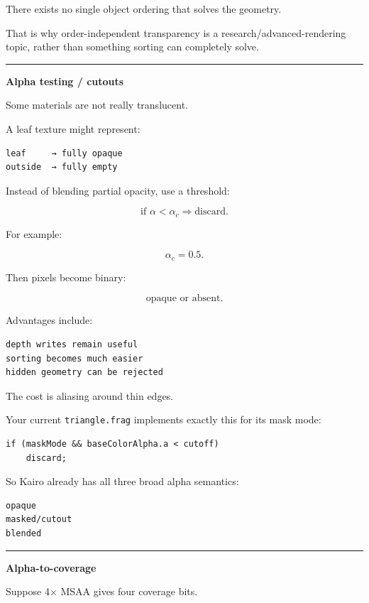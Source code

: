 There exists no single object ordering that solves the geometry.

That is why order-independent transparency is a research/advanced-rendering topic, rather than something sorting can completely solve.

\begin{center}\rule{0.5\linewidth}{0.5pt}\end{center}

\textbf{Alpha testing / cutouts}

Some materials are not really translucent.

A leaf texture might represent:

\begin{verbatim}
leaf     → fully opaque
outside  → fully empty
\end{verbatim}

Instead of blending partial opacity, use a threshold:

\[
\text{if }\alpha < \alpha_c
\Rightarrow
\text{discard}.
\]

For example:

\[
\alpha_c=0.5.
\]

Then pixels become binary:

\[
\text{opaque or absent}.
\]

Advantages include:

\begin{verbatim}
depth writes remain useful
sorting becomes much easier
hidden geometry can be rejected
\end{verbatim}

The cost is aliasing around thin edges.

Your current \texttt{triangle.frag} implements exactly this for its mask mode:

\begin{verbatim}
if (maskMode && baseColorAlpha.a < cutoff)
    discard;
\end{verbatim}

So Kairo already has all three broad alpha semantics:

\begin{verbatim}
opaque
masked/cutout
blended
\end{verbatim}

\begin{center}\rule{0.5\linewidth}{0.5pt}\end{center}

\textbf{Alpha-to-coverage}

Suppose 4× MSAA gives four coverage bits.

